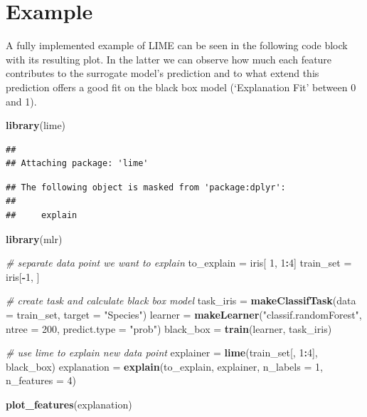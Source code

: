 \documentclass[]{krantz}
\newenvironment{Shaded}{\begin{snugshade}}{\end{snugshade}}
\newcommand{\KeywordTok}[1]{\textcolor[rgb]{0.13,0.29,0.53}{\textbf{#1}}}
\newcommand{\DataTypeTok}[1]{\textcolor[rgb]{0.13,0.29,0.53}{#1}}
\newcommand{\DecValTok}[1]{\textcolor[rgb]{0.00,0.00,0.81}{#1}}
\newcommand{\StringTok}[1]{\textcolor[rgb]{0.31,0.60,0.02}{#1}}
\newcommand{\CommentTok}[1]{\textcolor[rgb]{0.56,0.35,0.01}{\textit{#1}}}
\newcommand{\OperatorTok}[1]{\textcolor[rgb]{0.81,0.36,0.00}{\textbf{#1}}}
\newcommand{\NormalTok}[1]{#1}
\begin{document}
\section{Example}\label{example}

A fully implemented example of LIME can be seen in the following code
block with its resulting plot. In the latter we can observe how much
each feature contributes to the surrogate model's prediction and to what
extend this prediction offers a good fit on the black box model
(`Explanation Fit' between 0 and 1).

\begin{Shaded}
\begin{Highlighting}[]
\KeywordTok{library}\NormalTok{(lime)}
\end{Highlighting}
\end{Shaded}

\begin{verbatim}
## 
## Attaching package: 'lime'
\end{verbatim}

\begin{verbatim}
## The following object is masked from 'package:dplyr':
## 
##     explain
\end{verbatim}

\begin{Shaded}
\begin{Highlighting}[]
\KeywordTok{library}\NormalTok{(mlr)}

\CommentTok{# separate data point we want to explain}
\NormalTok{to_explain  =}\StringTok{ }\NormalTok{iris[ }\DecValTok{1}\NormalTok{, }\DecValTok{1}\OperatorTok{:}\DecValTok{4}\NormalTok{]}
\NormalTok{train_set   =}\StringTok{ }\NormalTok{iris[}\OperatorTok{-}\DecValTok{1}\NormalTok{, ]}

\CommentTok{# create task and calculate black box model}
\NormalTok{task_iris   =}\StringTok{ }\KeywordTok{makeClassifTask}\NormalTok{(}\DataTypeTok{data =}\NormalTok{ train_set, }
                              \DataTypeTok{target =} \StringTok{"Species"}\NormalTok{)}
\NormalTok{learner     =}\StringTok{ }\KeywordTok{makeLearner}\NormalTok{(}\StringTok{"classif.randomForest"}\NormalTok{, }
                          \DataTypeTok{ntree =} \DecValTok{200}\NormalTok{, }\DataTypeTok{predict.type =} \StringTok{"prob"}\NormalTok{)}
\NormalTok{black_box   =}\StringTok{ }\KeywordTok{train}\NormalTok{(learner, task_iris)}

\CommentTok{# use lime to explain new data point}
\NormalTok{explainer   =}\StringTok{ }\KeywordTok{lime}\NormalTok{(train_set[, }\DecValTok{1}\OperatorTok{:}\DecValTok{4}\NormalTok{], black_box)}
\NormalTok{explanation =}\StringTok{ }\KeywordTok{explain}\NormalTok{(to_explain,}
\NormalTok{                      explainer,}
                      \DataTypeTok{n_labels =} \DecValTok{1}\NormalTok{,}
                      \DataTypeTok{n_features =} \DecValTok{4}\NormalTok{)}

\KeywordTok{plot_features}\NormalTok{(explanation)}
\end{Highlighting}
\end{Shaded}
\end{document}
